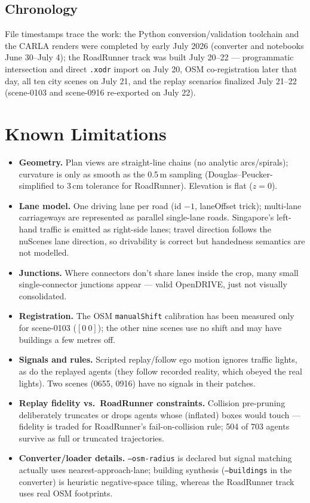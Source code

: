 \documentclass[11pt]{article}
\newcommand{\code}[1]{{\setlength{\fboxsep}{1.5pt}\colorbox{codegray}{\small\texttt{#1}}}}
\newcommand{\file}[1]{\texttt{#1}}
\begin{document}
\subsection{Chronology}
File timestamps trace the work: the Python conversion/validation toolchain and the
CARLA renders were completed by early July 2026 (converter and notebooks June
30--July 4); the RoadRunner track was built July 20--22 --- programmatic intersection
and direct \file{.xodr} import on July 20, OSM co-registration later that day, all ten
city scenes on July 21, and the replay scenarios finalized July 21--22 (scene-0103 and
scene-0916 re-exported on July 22).

\section{Known Limitations}
\label{sec:limitations}

\begin{itemize}
\item \textbf{Geometry.} Plan views are straight-line chains (no analytic
      arcs/spirals); curvature is only as smooth as the 0.5\,m sampling
      (Douglas--Peucker-simplified to 3\,cm tolerance for RoadRunner). Elevation is
      flat ($z=0$).
\item \textbf{Lane model.} One driving lane per road (id $-1$, laneOffset trick);
      multi-lane carriageways are represented as parallel single-lane roads.
      Singapore's left-hand traffic is emitted as right-side lanes; travel direction
      follows the nuScenes lane direction, so drivability is correct but handedness
      semantics are not modelled.
\item \textbf{Junctions.} Where connectors don't share lanes inside the crop, many
      small single-connector junctions appear --- valid OpenDRIVE, just not visually
      consolidated.
\item \textbf{Registration.} The OSM \code{manualShift} calibration has been measured
      only for scene-0103 ($[0\ 0]$); the other nine scenes use no shift and may have
      buildings a few metres off.
\item \textbf{Signals and rules.} Scripted replay/follow ego motion ignores traffic
      lights, as do the replayed agents (they follow recorded reality, which obeyed
      the real lights). Two scenes (0655, 0916) have no signals in their patches.
\item \textbf{Replay fidelity vs.\ RoadRunner constraints.} Collision pre-pruning
      deliberately truncates or drops agents whose (inflated) boxes would touch ---
      fidelity is traded for RoadRunner's fail-on-collision rule; 504 of 703 agents
      survive as full or truncated trajectories.
\item \textbf{Converter/loader details.} \code{--osm-radius} is declared but signal
      matching actually uses nearest-approach-lane; building synthesis
      (\code{--buildings} in the converter) is heuristic negative-space tiling, whereas
      the RoadRunner track uses real OSM footprints.
\end{itemize}
\end{document}
